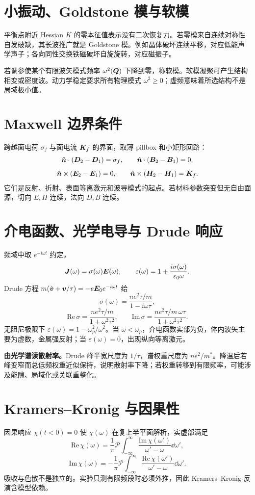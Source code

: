 \section{小振动、Goldstone 模与软模}
平衡点附近 Hessian $K$ 的零本征值表示没有二次恢复力。若零模来自连续对称性自发破缺，其长波推广就是 Goldstone 模。例如晶体破坏连续平移，对应低能声学声子；各向同性交换铁磁破坏自旋旋转，对应磁振子。

若调参使某个有限波矢模式频率
$\omega^2(\bm{Q})$ 下降到零，称软模。软模凝聚可产生结构相变或密度波。动力学稳定要求所有物理模式
$\omega^2\ge0$；虚频意味着所选结构不是局域极小值。

\section{Maxwell 边界条件}
跨越面电荷 $\sigma_f$ 与面电流 $\bm{K}_f$ 的界面，取薄 pillbox 和小矩形回路：
\[
\hat{\bm{n}}\cdot(\bm{D}_2-\bm{D}_1)=\sigma_f,\qquad
\hat{\bm{n}}\cdot(\bm{B}_2-\bm{B}_1)=0,
\]
\[
\hat{\bm{n}}\times(\bm{E}_2-\bm{E}_1)=0,\qquad
\hat{\bm{n}}\times(\bm{H}_2-\bm{H}_1)=\bm{K}_f.
\]
它们是反射、折射、表面等离激元和波导模式的起点。若材料参数突变但无自由面源，切向 $E,H$ 连续，法向 $D,B$ 连续。

\section{介电函数、光学电导与 Drude 响应}
频域中取 $e^{-i\omega t}$ 约定，
\[
\bm{J}(\omega)=\sigma(\omega)\bm{E}(\omega),\qquad
\varepsilon(\omega)=1+\frac{i\sigma(\omega)}
{\varepsilon_0\omega}.
\]
Drude 方程
$m(\dot{\bm{v}}+\bm{v}/\tau)=-e\bm{E}_0e^{-i\omega t}$ 给
\[
\boxed{\sigma(\omega)=\frac{ne^2\tau/m}{1-i\omega\tau}},
\]
\[
\mathrm{Re}\,\sigma=\frac{ne^2\tau/m}{1+\omega^2\tau^2},
\qquad
\mathrm{Im}\,\sigma=\frac{ne^2\tau/m\,\omega\tau}
{1+\omega^2\tau^2}.
\]
无阻尼极限下
$\varepsilon(\omega)=1-\omega_p^2/\omega^2$。当 $\omega<\omega_p$，介电函数实部为负，体内波矢主要为虚数，金属强反射；当 $\varepsilon(\omega)=0$，出现纵向等离激元。

\begin{examplebox}
\textbf{由光学谱读散射率。}Drude 峰半宽尺度为 $1/\tau$，谱权重尺度为 $ne^2/m^*$。降温后若峰变窄而总低频权重近似保持，说明散射率下降；若权重转移到有限频率，可能涉及能隙、局域化或关联重整化。
\end{examplebox}

\section{Kramers--Kronig 与因果性}
因果响应 $\chi(t<0)=0$ 使 $\chi(\omega)$ 在复上半平面解析，实虚部满足
\[
\mathrm{Re}\,\chi(\omega)=\frac1\pi\mathcal P
\int_{-\infty}^{\infty}
\frac{\mathrm{Im}\,\chi(\omega')}{\omega'-\omega}\dd\omega',
\]
\[
\mathrm{Im}\,\chi(\omega)=-\frac1\pi\mathcal P
\int_{-\infty}^{\infty}
\frac{\mathrm{Re}\,\chi(\omega')}{\omega'-\omega}\dd\omega'.
\]
吸收与色散不是独立的。实验只测有限频段时必须外推，因此 Kramers--Kronig 反演含模型依赖。

